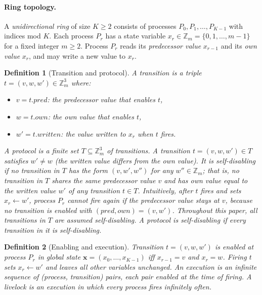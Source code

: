 \documentclass{article}
\newtheorem{definition}{Definition}
\newcommand{\Zm}{\mathbb{Z}_m}
\newcommand{\own}{\mathit{own}}
\newcommand{\writ}{\mathit{written}}
\newcommand{\pred}{\mathit{pred}}
\begin{document}
\paragraph{Ring topology.}
A \emph{unidirectional ring} of size $K\!\geq\!2$ consists of processes
$P_0,P_1,\ldots,P_{K-1}$ with indices mod $K$. Each process $P_r$ has a
state variable $x_r \in \Zm = \{0,1,\ldots,m-1\}$ for a fixed integer
$m\!\geq\!2$. Process $P_r$ reads its \emph{predecessor value}
$x_{r-1}$ and its \emph{own value} $x_r$, and may write a new value to
$x_r$.

\begin{definition}[Transition and protocol]
\label{def:trans}
A \emph{transition} is a triple $t=(v,w,w')\in\Zm^3$ where:
\begin{itemize}
  \item $v = t.\pred$: the predecessor value that enables $t$,
  \item $w = t.\own$: the own value that enables $t$,
  \item $w' = t.\writ$: the value written to $x_r$ when $t$ fires.
\end{itemize}
A \emph{protocol} is a finite set $T\subseteq\Zm^3$ of transitions.
A transition $t=(v,w,w')\in T$ satisfies $w'\neq w$ (the written value
differs from the own value). It is \emph{self-disabling} if no
transition in $T$ has the form $(v, w', w'')$ for any $w''\in\Zm$;
that is, no transition in $T$ shares the same predecessor value $v$
and has own value equal to the written value $w'$ of any transition $t \in T$. Intuitively,
after $t$ fires and sets $x_r\!\leftarrow\!w'$, process $P_r$ cannot
fire again if the predecessor value stays at $v$, because no
transition is enabled with $(\pred,\own) = (v,w')$.
Throughout this paper, \emph{all transitions in $T$ are assumed
self-disabling}.
A \emph{protocol} is \emph{self-disabling} if every transition in it
is self-disabling.
\end{definition}

\begin{definition}[Enabling and execution]
\label{def:exec}
Transition $t=(v,w,w')$ is \emph{enabled} at process $P_r$ in global
state $\mathbf{x}=(x_0,\ldots,x_{K-1})$ iff $x_{r-1}=v$ and $x_r=w$.
Firing $t$ sets $x_r\leftarrow w'$ and leaves all other variables
unchanged. An \emph{execution} is an infinite sequence of
(process, transition) pairs, each pair enabled at the time of firing.
A \emph{livelock} is an execution in which every process fires
infinitely often.
\end{definition}
\end{document}
